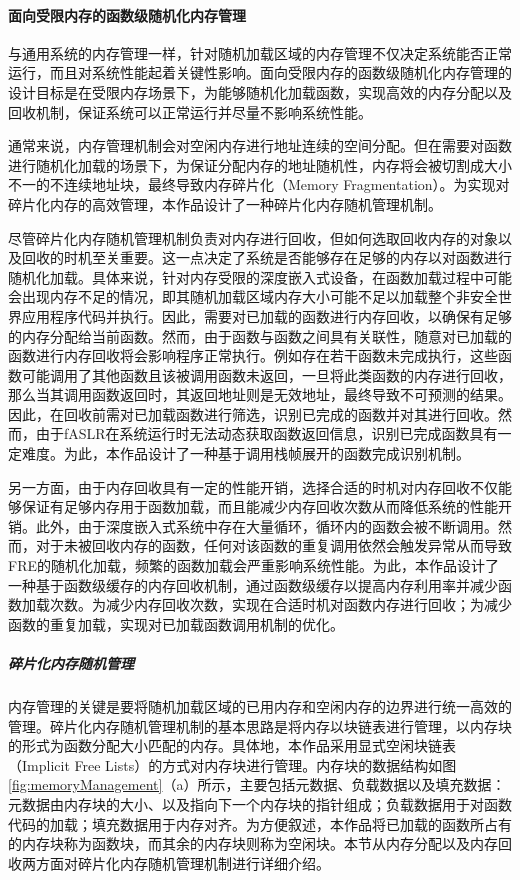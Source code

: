 \documentclass[UTF8,12pt,a4paper]{ctexart}
\numberwithin{figure}{section}
\begin{document}
\paragraph{面向受限内存的函数级随机化内存管理}
\par 与通用系统的内存管理一样，针对随机加载区域的内存管理不仅决定系统能否正常运行，而且对系统性能起着关键性影响。面向受限内存的函数级随机化内存管理的设计目标是在受限内存场景下，为能够随机化加载函数，实现高效的内存分配以及回收机制，保证系统可以正常运行并尽量不影响系统性能。
\par 通常来说，内存管理机制会对空闲内存进行地址连续的空间分配。但在需要对函数进行随机化加载的场景下，为保证分配内存的地址随机性，内存将会被切割成大小不一的不连续地址块，最终导致内存碎片化（Memory Fragmentation）。为实现对碎片化内存的高效管理，本作品设计了一种碎片化内存随机管理机制。
\par 尽管碎片化内存随机管理机制负责对内存进行回收，但如何选取回收内存的对象以及回收的时机至关重要。这一点决定了系统是否能够存在足够的内存以对函数进行随机化加载。具体来说，针对内存受限的深度嵌入式设备，在函数加载过程中可能会出现内存不足的情况，即其随机加载区域内存大小可能不足以加载整个非安全世界应用程序代码并执行。因此，需要对已加载的函数进行内存回收，以确保有足够的内存分配给当前函数。然而，由于函数与函数之间具有关联性，随意对已加载的函数进行内存回收将会影响程序正常执行。例如存在若干函数未完成执行，这些函数可能调用了其他函数且该被调用函数未返回，一旦将此类函数的内存进行回收，那么当其调用函数返回时，其返回地址则是无效地址，最终导致不可预测的结果。因此，在回收前需对已加载函数进行筛选，识别已完成的函数并对其进行回收。然而，由于fASLR在系统运行时无法动态获取函数返回信息，识别已完成函数具有一定难度。为此，本作品设计了一种基于调用栈帧展开的函数完成识别机制。
\par 另一方面，由于内存回收具有一定的性能开销，选择合适的时机对内存回收不仅能够保证有足够内存用于函数加载，而且能减少内存回收次数从而降低系统的性能开销。此外，由于深度嵌入式系统中存在大量循环，循环内的函数会被不断调用。然而，对于未被回收内存的函数，任何对该函数的重复调用依然会触发异常从而导致FRE的随机化加载，频繁的函数加载会严重影响系统性能。为此，本作品设计了一种基于函数级缓存的内存回收机制，通过函数级缓存以提高内存利用率并减少函数加载次数。为减少内存回收次数，实现在合适时机对函数内存进行回收；为减少函数的重复加载，实现对已加载函数调用机制的优化。
\subparagraph{碎片化内存随机管理}
\par 内存管理的关键是要将随机加载区域的已用内存和空闲内存的边界进行统一高效的管理。碎片化内存随机管理机制的基本思路是将内存以块链表进行管理，以内存块的形式为函数分配大小匹配的内存。具体地，本作品采用显式空闲块链表（Implicit Free Lists）的方式对内存块进行管理。内存块的数据结构如图\ref{fig:memoryManagement}（a）所示，主要包括元数据、负载数据以及填充数据：元数据由内存块的大小、以及指向下一个内存块的指针组成；负载数据用于对函数代码的加载；填充数据用于内存对齐。为方便叙述，本作品将已加载的函数所占有的内存块称为函数块，而其余的内存块则称为空闲块。本节从内存分配以及内存回收两方面对碎片化内存随机管理机制进行详细介绍。
\end{document}
